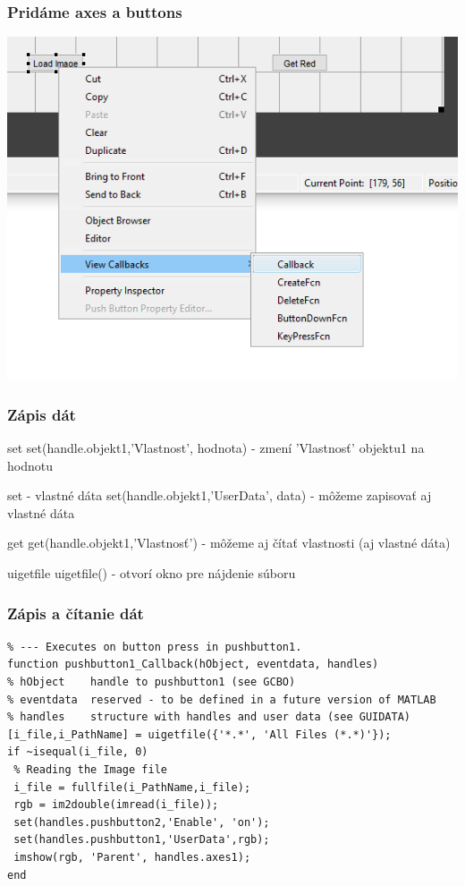 \documentclass{beamer}
\begin{document}
\begin{frame}
  \frametitle{Pridáme axes a buttons}
  \centering
  \includegraphics[width=\textwidth, height=0.8\textheight,keepaspectratio]{screens/callbacks.png}
\end{frame}

\begin{frame}
  \frametitle{Zápis dát}
  \begin{block}{set}
  set(handle.objekt1,'Vlastnost', hodnota) - zmení 'Vlastnosť' objektu1 na hodnotu
 \end{block}
 
   \begin{block}{set - vlastné dáta}
  set(handle.objekt1,'UserData', data) - môžeme zapisovať aj vlastné dáta
 \end{block}
 
   \begin{block}{get}
  get(handle.objekt1,'Vlastnosť') - môžeme aj čítať vlastnosti (aj vlastné dáta)
 \end{block}

   \begin{block}{uigetfile}
  uigetfile() - otvorí okno pre nájdenie súboru
 \end{block}
\end{frame}

\begin{frame}[fragile]
  \frametitle{Zápis a čítanie dát}
  \begin{verbatim}
% --- Executes on button press in pushbutton1.
function pushbutton1_Callback(hObject, eventdata, handles)
% hObject    handle to pushbutton1 (see GCBO)
% eventdata  reserved - to be defined in a future version of MATLAB
% handles    structure with handles and user data (see GUIDATA)
[i_file,i_PathName] = uigetfile({'*.*', 'All Files (*.*)'});
if ~isequal(i_file, 0)
 % Reading the Image file
 i_file = fullfile(i_PathName,i_file);
 rgb = im2double(imread(i_file));
 set(handles.pushbutton2,'Enable', 'on');
 set(handles.pushbutton1,'UserData',rgb);
 imshow(rgb, 'Parent', handles.axes1);
end \end{verbatim}
\end{frame}
\end{document}
